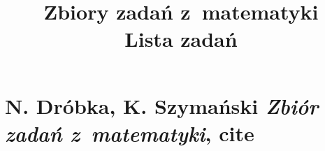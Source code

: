 \documentclass[a4paper,11pt]{article}
\title{Zbiory zadań z~matematyki \\
  {\Large Lista zadań}}
\numberwithin{equation}{section}
\begin{document}





\maketitle





\section{N. Dróbka, K. Szymański \textit{Zbiór zadań
    z~matematyki}, cite{}}

\label{sec:Oznaczenia-i-konwencje}
\end{document}
